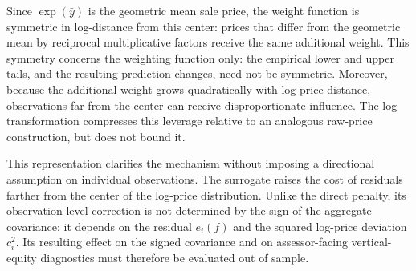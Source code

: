 \documentclass[10pt]{article}
\theoremstyle{definition}
\newcommand{\1}{\mathbf{1}}
\begin{document}

{Since $\exp(\bar y)$ is the geometric mean sale price, the weight function is symmetric in log-distance from this center: prices that differ from the geometric mean by reciprocal multiplicative factors receive the same additional weight. This symmetry concerns the weighting function only: the empirical lower and upper tails, and the resulting prediction changes, need not be symmetric. Moreover, because the additional weight grows quadratically with log-price distance, observations far from the center can receive disproportionate influence. The log transformation compresses this leverage relative to an analogous raw-price construction, but does not bound it.}


{This representation clarifies the mechanism without imposing a directional assumption on individual observations. The surrogate raises the cost of residuals farther from the center of the log-price distribution. Unlike the direct penalty, its observation-level correction is not determined by the sign of the aggregate covariance: it depends on the residual $e_i(f)$ and the squared log-price deviation $c_i^2$. Its resulting effect on the signed covariance and on assessor-facing vertical-equity diagnostics must therefore be evaluated out of sample.}

\end{document}
